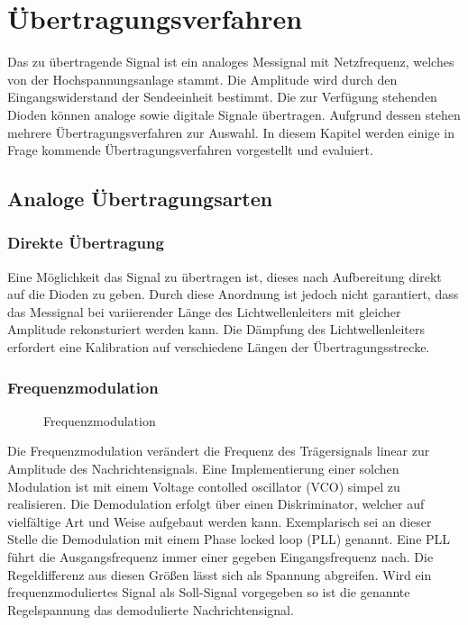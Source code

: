 \section{Übertragungsverfahren}
Das zu übertragende Signal ist ein analoges Messignal mit Netzfrequenz, welches von der Hochspannungsanlage stammt. Die Amplitude wird durch den Eingangswiderstand der Sendeeinheit bestimmt. Die zur Verfügung stehenden Dioden können analoge sowie digitale Signale übertragen. Aufgrund dessen stehen mehrere Übertragungsverfahren zur Auswahl.
In diesem Kapitel werden einige in Frage kommende Übertragungsverfahren vorgestellt und evaluiert.
\subsection{Analoge Übertragungsarten}
\subsubsection{Direkte Übertragung}
Eine Möglichkeit das Signal zu übertragen ist, dieses nach Aufbereitung direkt auf die Dioden zu geben.
Durch diese Anordnung ist jedoch nicht garantiert, dass das Messignal bei variierender Länge des Lichtwellenleiters mit gleicher Amplitude rekonsturiert werden kann. Die Dämpfung des Lichtwellenleiters erfordert eine Kalibration auf verschiedene Längen der Übertragungs\-strecke.
\subsubsection{Frequenzmodulation}
\begin{figure}[H]
\centering
  
  \caption{Frequenzmodulation}
  \label{fig:fm}
\end{figure}
Die Frequenzmodulation verändert die Frequenz des Trägersignals linear zur Amplitude des Nachrichtensignals.
Eine Implementierung einer solchen Modulation ist mit einem Voltage contolled oscillator (VCO) simpel zu realisieren. Die Demodulation erfolgt über einen Diskriminator, welcher auf vielfältige Art und Weise aufgebaut werden kann. Exemplarisch sei an dieser Stelle die Demodulation mit einem Phase locked loop (PLL) genannt. Eine PLL führt die Ausgangsfrequenz immer einer gegeben Eingangsfrequenz nach. Die Regeldifferenz aus diesen Größen lässt sich als Spannung abgreifen. Wird ein frequenzmoduliertes Signal als Soll-Signal vorgegeben so ist die genannte Regelspannung das demodulierte Nachrichtensignal.

